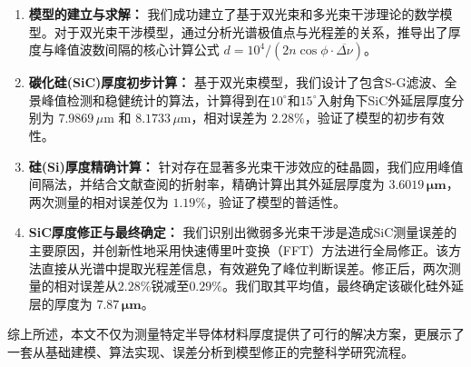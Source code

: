 \documentclass[withoutpreface,bwprint]{cumcmthesis} %
\begin{document}
\begin{enumerate}
    \item \textbf{模型的建立与求解：} 我们成功建立了基于双光束和多光束干涉理论的数学模型。对于双光束干涉模型，通过分析光谱极值点与光程差的关系，推导出了厚度与峰值波数间隔的核心计算公式 $d = 10^4 / (2n\cos\phi \cdot \overline{\Delta\nu})$。

    \item \textbf{碳化硅(SiC)厚度初步计算：} 基于双光束模型，我们设计了包含S-G滤波、全景峰值检测和稳健统计的算法，计算得到在$10^\circ$和$15^\circ$入射角下SiC外延层厚度分别为 $7.9869 \, \mu\text{m}$ 和 $8.1733 \, \mu\text{m}$，相对误差为 $2.28\%$，验证了模型的初步有效性。

    \item \textbf{硅(Si)厚度精确计算：} 针对存在显著多光束干涉效应的硅晶圆，我们应用峰值间隔法，并结合文献查阅的折射率，精确计算出其外延层厚度为 $\mathbf{3.6019 \, \mu m}$，两次测量的相对误差仅为 $1.19\%$，验证了模型的普适性。

    \item \textbf{SiC厚度修正与最终确定：} 我们识别出微弱多光束干涉是造成SiC测量误差的主要原因，并创新性地采用快速傅里叶变换（FFT）方法进行全局修正。该方法直接从光谱中提取光程差信息，有效避免了峰位判断误差。修正后，两次测量的相对误差从$2.28\%$锐减至$\mathbf{0.29\%}$。我们取其平均值，最终确定该碳化硅外延层的厚度为 $\mathbf{7.87 \, \mu m}$。
\end{enumerate}

综上所述，本文不仅为测量特定半导体材料厚度提供了可行的解决方案，更展示了一套从基础建模、算法实现、误差分析到模型修正的完整科学研究流程。
\end{document}
